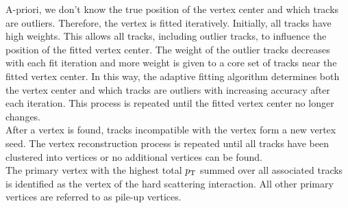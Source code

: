 \indent A-priori, we don't know the true position of the vertex center and which tracks are outliers.  Therefore, the vertex is fitted iteratively.  Initially, all tracks have high weights. This allows all tracks, including outlier tracks, to influence the position of the fitted vertex center.  The weight of the outlier tracks decreases with each fit iteration and more weight is given to a core set of tracks near the fitted vertex center.  In this way, the adaptive fitting algorithm determines both the vertex center and which tracks are outliers with increasing accuracy after each iteration.  This process is repeated until the fitted vertex center no longer changes. \\




\indent After a vertex is found, tracks incompatible with the vertex form a new vertex seed.  The vertex reconstruction process is repeated until all tracks have been clustered into vertices or no additional vertices can be found.\\ %

\indent The primary vertex with the highest total $p_{\mathrm{T}}$ summed over all associated tracks is identified as the vertex of the hard scattering interaction.  All other primary vertices are referred to as pile-up vertices.
